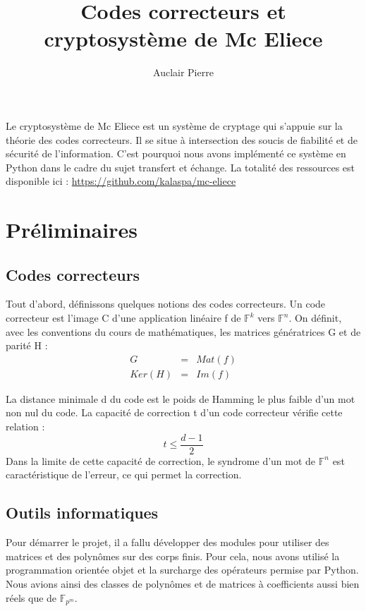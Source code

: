 \documentclass{article}
\title{Codes correcteurs et cryptosystème de Mc Eliece}
\author{Auclair Pierre}
\begin{document}
	\maketitle

	Le cryptosystème de Mc Eliece est un système de cryptage qui s'appuie sur la théorie des codes correcteurs.
	Il se situe à intersection des soucis de fiabilité et de sécurité de l'information.
	C'est pourquoi nous avons implémenté ce système en Python dans le cadre du sujet transfert et échange.
	La totalité des ressources est disponible ici : \url{https://github.com/kalaspa/mc-eliece}


	\section*{Préliminaires}

		\subsection*{Codes correcteurs}
			Tout d'abord, définissons quelques notions des codes correcteurs.
			Un code correcteur est l'image C d'une application linéaire f de $\mathbb{F}^{k}$ vers $\mathbb{F}^{n}$.
			On définit, avec les conventions du cours de mathématiques, les matrices génératrices G et de parité H :
			\begin{eqnarray*}
				G &=& Mat(f) \\
				Ker(H) &=& Im(f)
			\end{eqnarray*}

			La distance minimale d du code est le poids de Hamming le plus faible d'un mot non nul du code.
			La capacité de correction t d'un code correcteur vérifie cette relation :
			$$
				t \leq \frac{d-1}{2}
			$$
			Dans la limite de cette capacité de correction, le syndrome d'un mot de $\mathbb{F}^{n}$ est caractéristique de l'erreur, ce qui permet la correction.

		\subsection*{Outils informatiques}
			Pour démarrer le projet, il a fallu développer des modules pour utiliser des matrices et des polynômes sur des corps finis.
			Pour cela, nous avons utilisé la programmation orientée objet et la surcharge des opérateurs permise par Python.
			Nous avions ainsi des classes de polynômes et de matrices à coefficients aussi bien réels que de $\mathbb{F}_{p^{m}}$.
\end{document}
